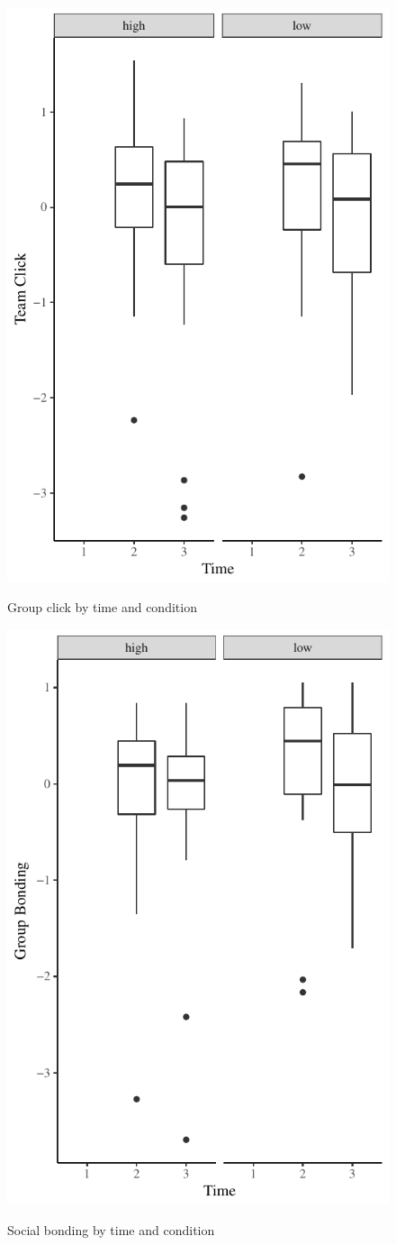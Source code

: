 \begin{figure}
  \centering
  \includegraphics[width=0.5\linewidth,keepaspectratio] {images/prePostClickPLot}
  \label{fig:prePostClickPLot}
  \caption{Group click by time and condition}
\end{figure}


\begin{figure}
  \centering
  \includegraphics[width=0.5\linewidth,keepaspectratio] {images/prePostBondingPlot}
    \label{fig:prePostBondingPlot}
  \caption{Social bonding by time and condition}
\end{figure}


